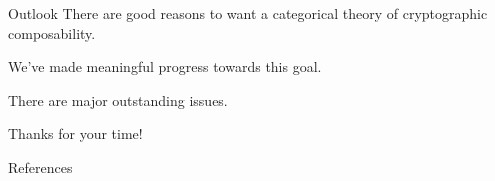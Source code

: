 \documentclass{beamer}
\begin{document}




\begin{frame}{Outlook}
  \pause
  There are good reasons to want a categorical theory of cryptographic
  composability.

  \pause
  We've made meaningful progress towards this goal.

  \pause
  There are major outstanding issues.

  \pause
  \vspace{2em}
  \begin{center}
    Thanks for your time!
  \end{center}
  \vspace{-3em}
\end{frame}

\begin{frame}[fragile]{References}
  \AtNextBibliography{\small}
  \printbibliography[heading=none, env=midbib]
\end{frame}
\end{document}
